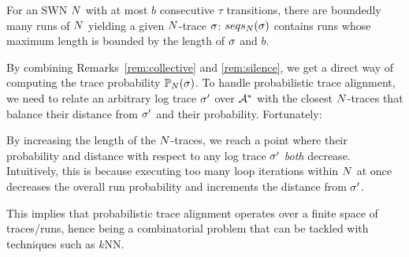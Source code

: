 \begin{remark}
\label{rem:silence}
	For an SWN $N$ with at most $b$ consecutive $\tau$ transitions, there are boundedly many runs of $N$ yielding a given $N$-trace ${\sigma}$: $seqs_{N}({\sigma})$ contains runs whose maximum length is bounded by the length of ${\sigma}$ and $b$.
\end{remark}

By combining Remarks~\ref{rem:collective} and \ref{rem:silence}, we get a direct way of computing the trace probability $\mathbb{P}_{N}({\sigma})$.
To handle probabilistic trace alignment, we need to relate an arbitrary log trace $\sigma'$ over $\mathcal{A}^*$ with the closest $N$-traces that balance their distance from $\sigma'$ and their probability. Fortunately:

\begin{remark}
By increasing the length of the $N$-traces, we reach a point where their probability and distance with respect to any log trace $\sigma'$ \emph{both} decrease. Intuitively, this is because executing too many loop iterations within $N$ at once decreases the overall run probability and increments the distance from $\sigma'$.
\end{remark}

This implies that probabilistic trace alignment operates over a finite space of traces/runs, hence being a combinatorial problem that can be tackled with techniques such as $k$NN.







